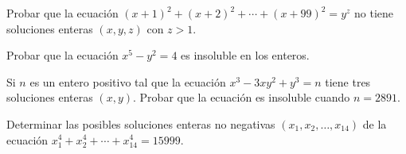 \begin{exercise}
    Probar que la ecuación $(x + 1)^2 + (x + 2)^2 + \cdots + (x + 99)^2 = y^z$ no tiene soluciones enteras $(x,y,z)$ con $z > 1$.
\end{exercise}

\begin{exercise}
    Probar que la ecuación $x^5 - y^2 = 4$ es insoluble en los enteros.
\end{exercise}

\begin{exercise}
    Si $n$ es un entero positivo tal que la ecuación $x^3 - 3xy^2 + y^3 = n$ tiene tres soluciones enteras $(x,y)$.
    Probar que la ecuación es insoluble cuando $n = 2891$.
\end{exercise}

\begin{exercise}
    Determinar las posibles soluciones enteras no negativas $(x_1, x_2, \ldots, x_{14})$ de la ecuación $x_1^4 + x_2^4 + \cdots + x_{14}^4 = 15999$.
\end{exercise}